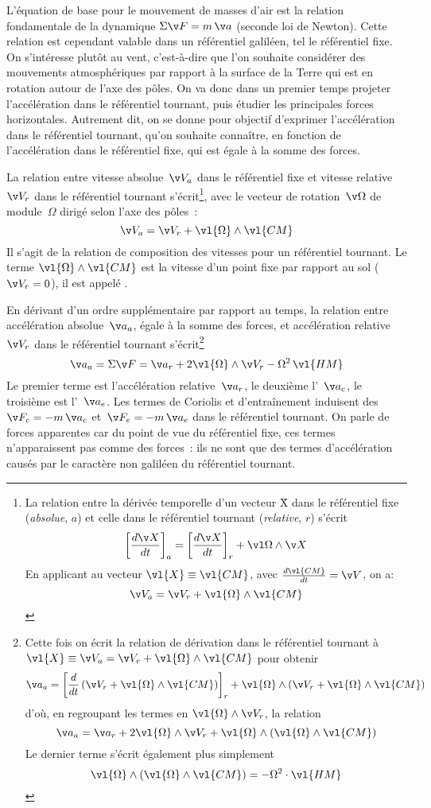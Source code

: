 \sk
L'équation de base pour le mouvement de masses d'air est la relation fondamentale de la dynamique $\Sigma \v F=m \, \v a$ (seconde loi de Newton).  Cette relation est cependant valable dans un référentiel galiléen, tel le référentiel fixe. On s'intéresse plutôt au vent, c'est-à-dire que l'on souhaite considérer des mouvements atmosphériques par rapport à la surface de la Terre qui est en rotation autour de l'axe des pôles. On va donc dans un premier temps projeter l'accélération dans le référentiel tournant, puis étudier les principales forces horizontales. Autrement dit, on se donne pour objectif d'exprimer l'accélération dans le référentiel tournant, qu'on souhaite connaître, en fonction de l'accélération dans le référentiel fixe, qui est égale à la somme des forces.

\sk
La relation entre vitesse absolue~$\v V_a$ dans le référentiel fixe et vitesse relative~$\v V_r$ dans le référentiel tournant s'écrit\footnote{La relation entre la dérivée temporelle d'un vecteur \v X dans le référentiel fixe (\emph{absolue}, $a$) et celle dans le référentiel tournant (\emph{relative}, $r$) s'écrit \[ \left[ \frac{d\v X}{dt} \right]_{a} = \left[ \frac{d\v X}{dt} \right]_{r} + \vl \Omega\wedge \v X\] En applicant au vecteur $\vl{X} \equiv \vl{CM}$, avec $\frac{d\vl{CM}}{dt}=\v V$, on a: \[\v V_a=\v V_r+\vl{\Omega}\wedge\vl{CM}\]}, avec le vecteur de rotation~$\v \Omega$ de module~$\Omega$ dirigé selon l'axe des pôles~:
\[\v V_a = \v V_r + \vl{\Omega}\wedge\vl{CM}\]
Il s'agit de la relation de composition des vitesses pour un référentiel tournant. Le terme $\vl{\Omega}\wedge\vl{CM}$ est la vitesse d'un point fixe par rapport au sol ($\v V_r=0$), il est appelé .

\sk
En dérivant d'un ordre supplémentaire par rapport au temps, la relation entre accélération absolue~$\v a_a$, égale à la somme des forces, et accélération relative~$\v V_r$ dans le référentiel tournant s'écrit\footnote{Cette fois on écrit la relation de dérivation dans le référentiel tournant à $\vl{X} \equiv \v V_a= \v V_r+\vl{\Omega}\wedge\vl{CM}$ pour obtenir \[\v a_a = \left[ \frac{d}{dt} \left( \v V_r+\vl{\Omega}\wedge\vl{CM} \right) \right]_{r} + \vl{\Omega}\wedge \left(\v V_r+\vl{\Omega}\wedge\vl{CM}\right)\] d'où, en regroupant les termes en $\vl{\Omega}\wedge\v V_r$, la relation \[ \v a_a=\v a_r + 2\vl{\Omega}\wedge\v V_r + \vl{\Omega}\wedge(\vl{\Omega}\wedge\vl{CM}) \] \noindent Le dernier terme s'écrit également plus simplement \[ \vl{\Omega}\wedge(\vl{\Omega}\wedge\vl{CM})=-\Omega^2\cdot\vl{HM} \] }
\[ \v a_a=\Sigma\v F=\v a_r+2\vl{\Omega}\wedge\v V_r-\Omega^2\,\vl{HM} \]
Le premier terme est l'accélération relative~$\v a_r$, le deuxième l'~$\v a_c$, le troisième est l'~$\v a_e$. Les termes de Coriolis et d'entraînement induisent des ~$\v F_c = -m \, \v a_c$ et~$\v F_e = -m \, \v a_e$ dans le référentiel tournant. On parle de forces apparentes car du point de vue du référentiel fixe, ces termes n'apparaissent pas comme des forces~: ils ne sont que des termes d'accélération causés par le caractère non galiléen du référentiel tournant.


